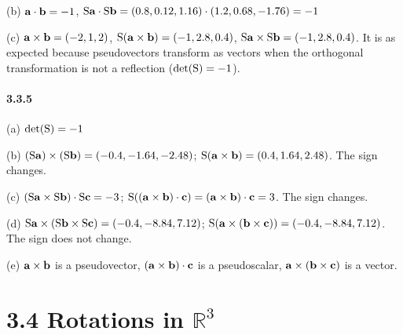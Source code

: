 \documentclass[a4paper]{article}
\begin{document}
(b) $\mathbf{a}\cdot\mathbf{b}=-1$, $\mathrm{S}\mathbf{a}\cdot\mathrm{S}\mathbf{b}=(0.8, 0.12, 1.16)\cdot(1.2, 0.68, -1.76)=-1$

(c) $\mathbf{a}\times\mathbf{b}=(-2, 1, 2)$, $\mathrm{S}(\mathbf{a}\times\mathbf{b})=(-1, 2.8, 0.4)$, $\mathrm{S}\mathbf{a}\times\mathrm{S}\mathbf{b}=(-1, 2.8, 0.4)$. It is as expected because pseudovectors transform as vectors when the orthogonal transformation is not a reflection ($\det (\mathrm{S})=-1$).

\paragraph{3.3.5}
(a) $\det (\mathrm{S})=-1$

(b) $(\mathrm{S}\mathbf{a})\times(\mathrm{S}\mathbf{b})=(-0.4, -1.64, -2.48)$; $\mathrm{S}(\mathbf{a}\times\mathbf{b})=(0.4, 1.64, 2.48)$. The sign changes.

(c) $(\mathrm{S}\mathbf{a}\times\mathrm{S}\mathbf{b})\cdot\mathrm{S}\mathbf{c}=-3$; $\mathrm{S}((\mathbf{a}\times\mathbf{b})\cdot\mathbf{c})=(\mathbf{a}\times\mathbf{b})\cdot\mathbf{c}=3$. The sign changes.

(d) $\mathrm{S}\mathbf{a}\times(\mathrm{S}\mathbf{b}\times\mathrm{S}\mathbf{c})=(-0.4, -8.84, 7.12)$; $\mathrm{S}(\mathbf{a}\times(\mathbf{b}\times\mathbf{c}))=(-0.4, -8.84, 7.12)$. The sign does not change.

(e) $\mathbf{a}\times\mathbf{b}$ is a pseudovector, $(\mathbf{a}\times\mathbf{b})\cdot\mathbf{c}$ is a pseudoscalar, $\mathbf{a}\times(\mathbf{b}\times\mathbf{c})$ is a vector.

\section*{3.4 Rotations in $\mathbb{R}^3$}
\end{document}
